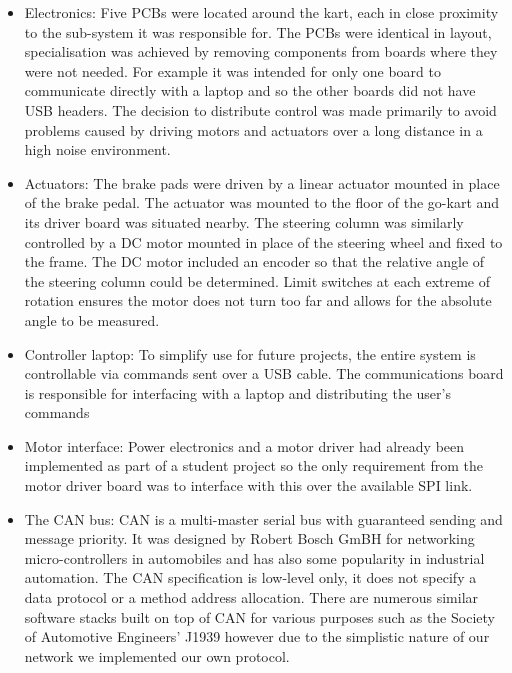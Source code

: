 \begin{itemize}
 \item Electronics: Five PCBs were located around the kart, each in close proximity to 
 the sub-system it was responsible for. The PCBs were identical in layout, specialisation was
 achieved by removing components from boards where they were not needed. For example
 it was intended for only one board to communicate directly with a laptop and so the other
 boards did not have USB headers. The decision to distribute control was made primarily to avoid
 problems caused by driving motors and actuators over a long distance in a high noise environment.
 \item Actuators: The brake pads were driven by a linear actuator mounted in place of the brake pedal. 
 The actuator was mounted to the floor of the go-kart and its driver board was situated nearby. The 
 steering column was similarly controlled by a DC motor mounted in place of the steering wheel 
 and fixed to the frame. The DC motor included an encoder so that the relative angle of the 
 steering column could be determined. Limit switches at each extreme of rotation ensures the
 motor does not turn too far and allows for the absolute angle to be measured.
 \item Controller laptop: To simplify use for future projects, the entire system is controllable via
 commands sent over a USB cable. The communications board is responsible for interfacing with
 a laptop and distributing the user's commands 
 
 \item Motor interface: Power electronics and a motor driver had already been implemented as part 
 of a student project so the only requirement from the motor driver board was to interface with this over
 the available SPI link.

 \item The CAN bus: CAN is a multi-master serial bus with guaranteed sending and message priority. It 
 was designed by Robert Bosch GmBH for networking micro-controllers in automobiles and has
 also some popularity in industrial automation. The CAN specification is low-level only, it does not specify 
 a data protocol or a method address allocation. There are numerous similar software stacks built on top
 of CAN for various purposes such as the Society of Automotive Engineers' J1939\cite{J1939} however due to the simplistic nature of our 
 network we implemented our own protocol.
\end{itemize}

